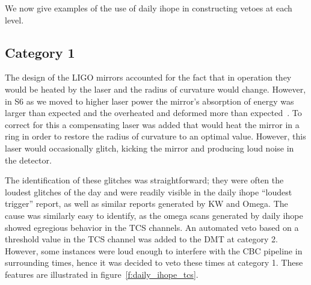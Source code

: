 We now give examples of the use of daily ihope in constructing vetoes
at each level.

\subsection{Category 1}


The design of the LIGO mirrors accounted for the fact that in
operation they would be heated by the laser and the radius of
curvature would change.  However, in S6 as we moved to higher laser
power the mirror's absorption of energy was larger than expected and
the overheated and deformed more than expected~\cite{}.  To correct
for this a compensating laser was added that would heat the mirror in
a ring in order to restore the radius of curvature to an optimal
value.  However, this laser would occasionally glitch, kicking the
mirror and producing loud noise in the detector.

The identification of these glitches was straightforward; they were
often the loudest glitches of the day and were readily visible in the
daily ihope ``loudest trigger'' report, as well as similar reports
generated by KW and Omega.  The cause was similarly easy to identify,
as the omega scans generated by daily ihope showed egregious behavior
in the TCS channels.  An automated veto based on a threshold value in
the TCS channel was added to the DMT at category 2.  However, some
instances were loud enough to interfere with the CBC pipeline in
surrounding times, hence it was decided to veto these times at
category 1.  These features are illustrated in
figure~\ref{f:daily_ihope_tcs}.  


%
% 

